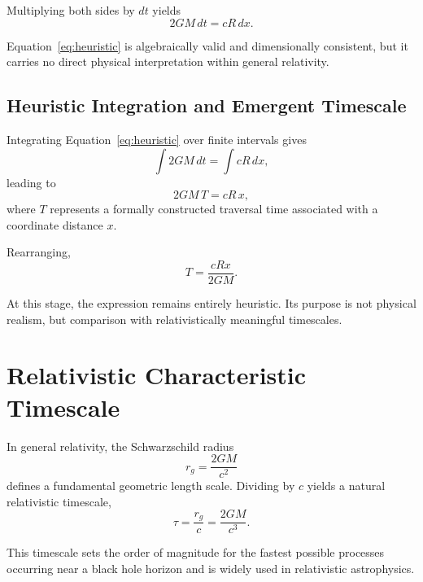 \documentclass[12pt,a4paper]{article}
\begin{document}
Multiplying both sides by $dt$ yields
\begin{equation}
2GM\, dt = c R\, dx.
\label{eq:heuristic}
\end{equation}

Equation~\eqref{eq:heuristic} is algebraically valid and dimensionally consistent, but it carries no direct physical interpretation within general relativity.

\subsection{Heuristic Integration and Emergent Timescale}

Integrating Equation~\eqref{eq:heuristic} over finite intervals gives
\begin{equation}
\int 2GM\, dt = \int c R\, dx,
\end{equation}
leading to
\begin{equation}
2GM\, T = c R\, x,
\end{equation}
where $T$ represents a formally constructed traversal time associated with a coordinate distance $x$.

Rearranging,
\begin{equation}
T = \frac{c R x}{2GM}.
\end{equation}

At this stage, the expression remains entirely heuristic. Its purpose is not physical realism, but comparison with relativistically meaningful timescales.

\section{Relativistic Characteristic Timescale}

In general relativity, the Schwarzschild radius
\begin{equation}
r_g = \frac{2GM}{c^2}
\end{equation}
defines a fundamental geometric length scale. Dividing by $c$ yields a natural relativistic timescale,
\begin{equation}
\tau = \frac{r_g}{c} = \frac{2GM}{c^3}.
\end{equation}

This timescale sets the order of magnitude for the fastest possible processes occurring near a black hole horizon and is widely used in relativistic astrophysics.

\end{document}
